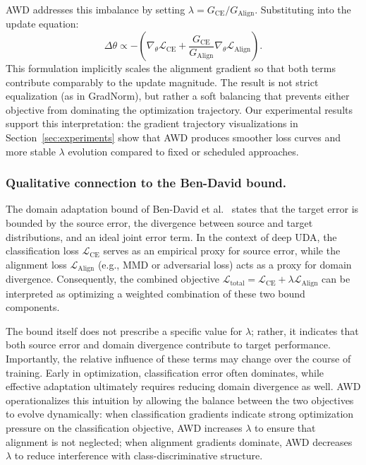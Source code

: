 \documentclass[pdflatex,sn-mathphys-num]{sn-jnl}
\theoremstyle{thmstyleone}
\theoremstyle{thmstyletwo}
\theoremstyle{thmstylethree}
\begin{document}
AWD addresses this imbalance by setting $\lambda = G_{\text{CE}} / G_{\text{Align}}$. Substituting into the update equation:
\begin{equation*}
\Delta \theta \propto -\left( \nabla_\theta \mathcal{L}_{\text{CE}} + \frac{G_{\text{CE}}}{G_{\text{Align}}} \nabla_\theta \mathcal{L}_{\text{Align}} \right).
\end{equation*}
This formulation implicitly scales the alignment gradient so that both terms contribute comparably to the update magnitude. The result is not strict equalization (as in GradNorm), but rather a soft balancing that prevents either objective from dominating the optimization trajectory. Our experimental results support this interpretation: the gradient trajectory visualizations in Section~\ref{sec:experiments} show that AWD produces smoother loss curves and more stable $\lambda$ evolution compared to fixed or scheduled approaches.

\subsubsection{Qualitative connection to the Ben-David bound.}
The domain adaptation bound of Ben-David et al.~\cite{bendavid2010theory} states that the target error is bounded by the source error, the divergence between source and target distributions, and an ideal joint error term. In the context of deep UDA, the classification loss $\mathcal{L}_{\text{CE}}$ serves as an empirical proxy for source error, while the alignment loss $\mathcal{L}_{\text{Align}}$ (e.g., MMD or adversarial loss) acts as a proxy for domain divergence. Consequently, the combined objective $\mathcal{L}_{\text{total}} = \mathcal{L}_{\text{CE}} + \lambda \mathcal{L}_{\text{Align}}$ can be interpreted as optimizing a weighted combination of these two bound components.

The bound itself does not prescribe a specific value for $\lambda$; rather, it indicates that both source error and domain divergence contribute to target performance. Importantly, the relative influence of these terms may change over the course of training. Early in optimization, classification error often dominates, while effective adaptation ultimately requires reducing domain divergence as well. AWD operationalizes this intuition by allowing the balance between the two objectives to evolve dynamically: when classification gradients indicate strong optimization pressure on the classification objective, AWD increases $\lambda$ to ensure that alignment is not neglected; when alignment gradients dominate, AWD decreases $\lambda$ to reduce interference with class-discriminative structure.
\end{document}
